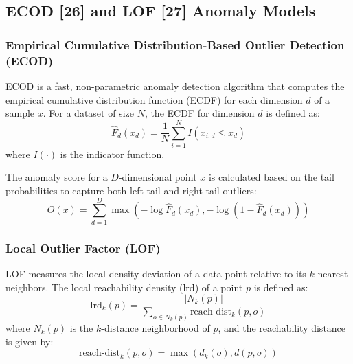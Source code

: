 \documentclass[12pt,a4paper,oneside]{report}
\begin{document}






\subsection{ECOD [26] and LOF [27] Anomaly Models}
\label{ecod-and-lof-anomaly-models}

\subsubsection{Empirical Cumulative Distribution-Based Outlier Detection (ECOD)}
ECOD is a fast, non-parametric anomaly detection algorithm that computes the empirical cumulative distribution function (ECDF) for each dimension $d$ of a sample $x$. For a dataset of size $N$, the ECDF for dimension $d$ is defined as:
\begin{equation}
\hat{F}_d(x_d) = \frac{1}{N} \sum_{i=1}^{N} I(x_{i,d} \le x_d)
\end{equation}
where $I(\cdot)$ is the indicator function.

The anomaly score for a $D$-dimensional point $x$ is calculated based on the tail probabilities to capture both left-tail and right-tail outliers:
\begin{equation}
O(x) = \sum_{d=1}^{D} \max\left(-\log \hat{F}_d(x_d), -\log(1 - \hat{F}_d(x_d))\right)
\end{equation}

\subsubsection{Local Outlier Factor (LOF)}
LOF measures the local density deviation of a data point relative to its $k$-nearest neighbors. The local reachability density ($\text{lrd}$) of a point $p$ is defined as:
\begin{equation}
\text{lrd}_k(p) = \frac{|N_k(p)|}{\sum_{o \in N_k(p)} \text{reach-dist}_k(p, o)}
\end{equation}
where $N_k(p)$ is the $k$-distance neighborhood of $p$, and the reachability distance is given by:
\begin{equation}
\text{reach-dist}_k(p, o) = \max(d_k(o), d(p, o))
\end{equation}
\end{document}

